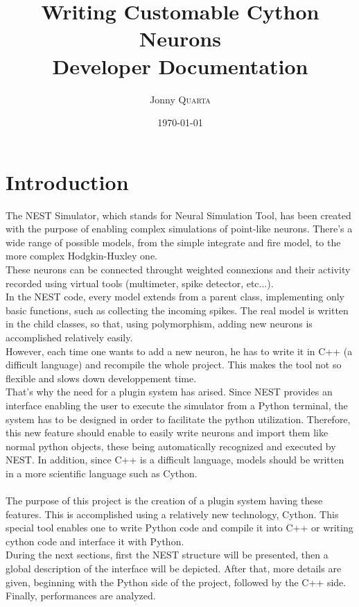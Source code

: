 \documentclass{article}
\title{Writing Customable Cython Neurons \\ Developer Documentation} %
\author{Jonny \textsc{Quarta}} %
\date{\today} %
\begin{document}
\maketitle %


\setlength\parindent{0pt} %

\renewcommand{\labelenumi}{\alph{enumi}.} %

\section{Introduction}
The NEST Simulator, which stands for Neural Simulation Tool, has been created with the purpose of enabling complex simulations of point-like neurons. There's a wide range of possible models, from the simple integrate and fire model, to the more complex Hodgkin-Huxley one.\\
These neurons can be connected throught weighted connexions and their activity recorded using virtual tools (multimeter, spike detector, etc...).\\

In the NEST code, every model extends from a parent class, implementing only basic functions, such as collecting the incoming spikes. The real model is written in the child classes, so that, using polymorphism, adding new neurons is accomplished relatively easily.\\
However, each time one wants to add a new neuron, he has to write it in C++ (a difficult language) and recompile the whole project. This makes the tool not so flexible and slows down developpement time.\\
That's why the need for a plugin system has arised. Since NEST provides an interface enabling the user to execute the simulator from a Python terminal, the system has to be designed in order to facilitate the python utilization.
Therefore, this new feature should enable to easily write neurons and import them like normal python objects, these being automatically recognized and executed by NEST. In addition, since C++ is a difficult language, models should be written in a more scientific language such as Cython.\\ \\
The purpose of this project is the creation of a plugin system having these features. This is accomplished using a relatively new technology, Cython. This special tool enables one to write Python code and compile it into C++ or writing cython code and interface it with Python.\\
During the next sections, first the NEST structure will be presented, then a global description of the interface will be depicted. After that, more details are given, beginning with the Python side of the project, followed by the C++ side. Finally, performances are analyzed.
\end{document}

